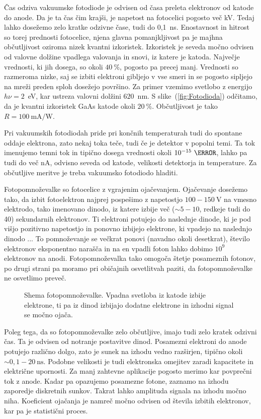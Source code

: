 Čas odziva vakuumske fotodiode je odvisen od časa preleta elektronov od katode do anode. 
Da je ta čas čim krajši, je napetost na fotocelici pogosto več kV. Tedaj lahko dosežemo 
zelo kratke odzivne čase, tudi do 0,1~ns. Enostavnost in hitrost so torej prednosti fotocelice, 
njena glavna pomanjkljivost pa je majhna občutljivost oziroma nizek kvantni izkoristek. 
Izkoristek je seveda močno odvisen od valovne dolžine vpadlega valovanja in snovi, iz 
katere je katoda. Največje vrednosti, ki jih dosega, so okoli $40~\%$, pogosto pa precej manj. 
Vrednosti so razmeroma nizke, saj se izbiti elektroni gibljejo v vse
smeri in se pogosto sipljejo na mreži preden sploh dosežejo površino. 
Za primer vzemimo svetlobo z energijo $h\nu = 2$~eV, kar ustreza valovni dolžini $620$~nm.
S slike~(\ref{fig:Fotodioda}) odčitamo, da je kvantni izkoristek GaAs katode okoli $20~\%$. 
Občutljivost je tako $R = 100~\si{\milli\ampere/\watt}$. 

Pri vakuumskih fotodiodah pride pri končnih temperaturah tudi do spontane oddaje elektrona, zato 
nekaj toka teče, tudi če je detektor v popolni temi. Ta tok imenujemo temni tok in tipično dosega
vrednosti okoli $10^{-15}~\ampere$, lahko pa tudi do več nA, odvisno seveda od katode, velikosti 
detektorja in temperature. Za občutljive meritve je treba vakuumsko fotodiodo hladiti. 

Fotopomnoževalke so fotocelice z vgrajenim ojačevanjem. Ojačevanje dosežemo tako, da 
izbit fotoelektron najprej pospešimo z napetostjo $100-150~\si{\volt}$ na vmesno elektrodo, 
tako imenovano dinodo, iz katere izbije več ($\sim 5 - 10$, redkeje tudi do 40) 
sekundarnih elektronov. Ti elektroni
potujejo do naslednje dinode, ki je pod višjo pozitivno napetostjo in ponovno izbijejo elektrone, 
ki vpadejo na naslednjo dinodo ... To pomnoževanje se večkrat ponovi (navadno okoli desetkrat),
število elektronov eksponentno narašča in na en vpadli foton lahko dobimo $10^9$ elektronov na anodi. 
Fotopomnoževalka tako omogoča štetje posameznih fotonov, po drugi strani pa moramo pri 
običajnih osvetlitvah paziti, da fotopomnoževalke ne osvetlimo preveč. 
\begin{figure}[h]
\centering
\def\svgwidth{80truemm} 

\caption{Shema fotopomnoževalke. Vpadna svetloba iz katode izbije elektrone, ti pa 
iz dinod izbijajo dodatne elektrone in izhodni signal se močno ojača.}
\label{fig:PMT}
\end{figure}

Poleg tega, da so fotopomnoževalke zelo občutljive, imajo tudi zelo kratek 
odzivni čas. Ta je odvisen od notranje postavitve dinod. Posamezni 
elektroni do anode potujejo različno dolgo, zato je sunek na izhodu 
vedno razširjen, tipično okoli $\sim 0,1-20~\si{\nano\second}$. Podobne velikosti je tudi 
elektronska omejitev zaradi kapacitete in električne upornosti. 
Za manj zahtevne aplikacije pogosto merimo kar povprečni tok z anode. Kadar pa opazujemo
posamezne fotone, zaznamo na izhodu zaporedje diskretnih sunkov. Takrat lahko 
amplituda signala na izhodu močno niha. Koeficient ojačanja je namreč
močno odvisen od števila izbitih elektronov, kar pa je statistični proces. 

